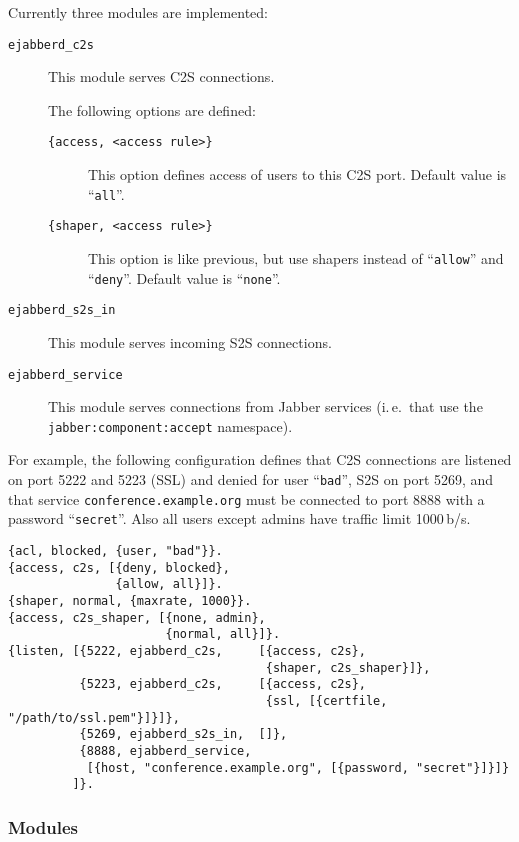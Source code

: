\documentclass[10pt]{article}
\newcommand{\Jabber}{Jabber}
\begin{document}
Currently three modules are implemented:
\begin{description}
\item[\texttt{ejabberd\_c2s}] This module serves C2S connections.
  
  The following options are defined:
  \begin{description}
  \item[\texttt{\{access, <access rule>\}}] This option defines access of users
    to this C2S port.  Default value is ``\texttt{all}''.
  \item[\texttt{\{shaper, <access rule>\}}] This option is like previous, but
    use shapers instead of ``\texttt{allow}'' and ``\texttt{deny}''.  Default
    value is ``\texttt{none}''.
  \end{description}
\item[\texttt{ejabberd\_s2s\_in}] This module serves incoming S2S connections.
\item[\texttt{ejabberd\_service}] This module serves connections from \Jabber{}
  services (i.\,e.\ that use the \texttt{jabber:component:accept} namespace).
\end{description}

For example, the following configuration defines that C2S connections are
listened on port 5222 and 5223 (SSL) and denied for user ``\texttt{bad}'', S2S
on port 5269, and that service \texttt{conference.example.org} must be
connected to port 8888 with a password ``\texttt{secret}''.  Also all users
except admins have traffic limit 1000\,b/s.
\begin{verbatim}
{acl, blocked, {user, "bad"}}.
{access, c2s, [{deny, blocked},
               {allow, all}]}.
{shaper, normal, {maxrate, 1000}}.
{access, c2s_shaper, [{none, admin},
                      {normal, all}]}.
{listen, [{5222, ejabberd_c2s,     [{access, c2s},
                                    {shaper, c2s_shaper}]},
          {5223, ejabberd_c2s,     [{access, c2s},
                                    {ssl, [{certfile, "/path/to/ssl.pem"}]}]},
          {5269, ejabberd_s2s_in,  []},
          {8888, ejabberd_service,
           [{host, "conference.example.org", [{password, "secret"}]}]}
         ]}.
\end{verbatim}




\subsubsection{Modules}
\label{sec:configmodules}
\end{document}
